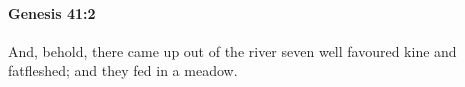 
		\paragraph{Genesis 41:2} %
			\label{GENESIS-41-2}

			And, behold, there came up out of the river seven well favoured kine and fatfleshed; and they fed in a meadow.


